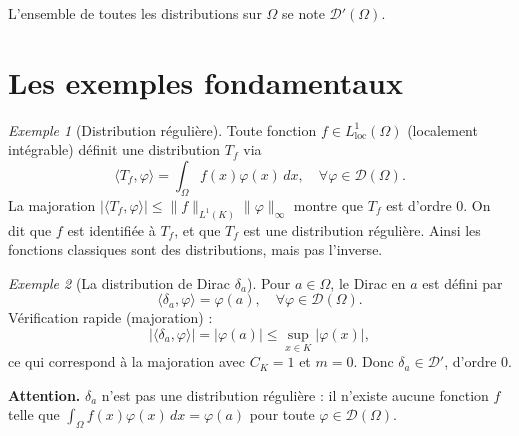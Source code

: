 \documentclass[12pt,a4paper,openany]{book}
\theoremstyle{definition}
\theoremstyle{plain}
\theoremstyle{remark}
\newtheorem*{example}{Exemple}
\begin{document}
	L'ensemble de toutes les distributions sur $\Omega$ se note $\mathcal{D}'(\Omega)$.
	
	\section{Les exemples fondamentaux}
	
	\begin{example}[Distribution régulière]
		Toute fonction $f \in L_{\text{loc}}^1(\Omega)$ (localement intégrable) définit une distribution $T_f$ via
		\[
		\langle T_f, \varphi \rangle = \int_{\Omega} f(x) \varphi(x) \, dx, \quad \forall \varphi \in \mathcal{D}(\Omega).
		\]
		La majoration $|\langle T_f, \varphi \rangle| \le \|f\|_{L^1(K)} \|\varphi\|_\infty$ montre que $T_f$ est d'ordre $0$. On dit que $f$ est identifiée à $T_f$, et que $T_f$ est une distribution régulière. Ainsi les fonctions classiques sont des distributions, mais pas l'inverse.
	\end{example}
	
	\begin{example}[La distribution de Dirac $\delta_a$]
		Pour $a \in \Omega$, le Dirac en $a$ est défini par
		\[
		\langle \delta_a, \varphi \rangle = \varphi(a), \quad \forall \varphi \in \mathcal{D}(\Omega).
		\]
		Vérification rapide (majoration) :
		\[
		|\langle \delta_a, \varphi \rangle| = |\varphi(a)| \le \sup_{x \in K} |\varphi(x)|,
		\]
		ce qui correspond à la majoration avec $C_K = 1$ et $m = 0$. Donc $\delta_a \in \mathcal{D}'$, d'ordre $0$.
		
		\textbf{Attention.} $\delta_a$ n'est pas une distribution régulière : il n'existe aucune fonction $f$ telle que $\int_\Omega f(x)\varphi(x)\,dx = \varphi(a)$ pour toute $\varphi \in \mathcal{D}(\Omega)$.
	\end{example}
	
\end{document}
